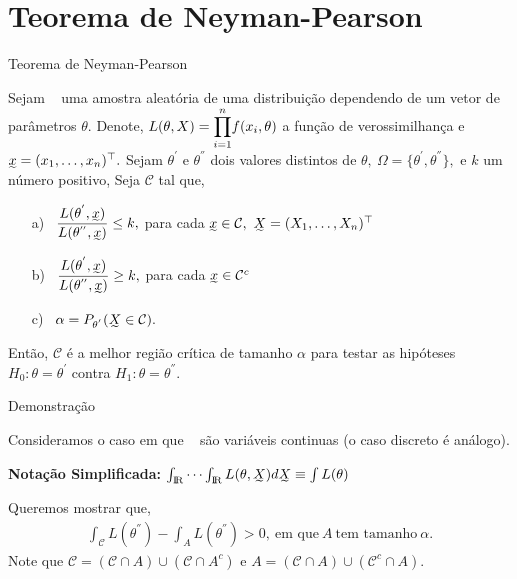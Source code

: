 \documentclass[12pt]{beamer}
\begin{document}
\section{Teorema de Neyman-Pearson}
\begin{frame}{Teorema de Neyman-Pearson}
\vspace{-0.5cm}
\begin{Teorema}
\justifying
Sejam \seqX~ uma amostra aleatória de uma distribuição dependendo de um vetor de parâmetros $\theta.$ Denote,
$L(\theta,X)={\displaystyle \prod_{i=1}^{n}} f(x_{i},\theta)$ a função de verossimilhança e $\undertilde{x}=(x_{1},\ldots,x_{n})^{\top}.$ Sejam $\theta^{'}$ e $\theta^{''}$ dois valores distintos de $\theta,~\Omega=\{\theta^{'},\theta^{''}\},$ e $k$ um número positivo, Seja $\mathcal{C}$ tal que,
\begin{enumerate}
    \item[a)~]$\dfrac{L(\theta^{'},\undertilde{x})}{L(\theta^{''},\undertilde{x})}\leq k,$ para cada $\undertilde{x}\in\mathcal{C},~\undertilde{X}=(X_{1},\ldots,X_{n})^{\top}$
    \item[b)~]$\dfrac{L(\theta^{'},\undertilde{x})}{L(\theta^{''},\undertilde{x})}\geq k,$ para cada $\undertilde{x}\in\mathcal{C}^{c}$
    \item[c)~]$\alpha=P_{\theta^{'}}(\undertilde{X}\in\mathcal{C}).$
\end{enumerate}
Então, $\mathcal{C}$ é a melhor região crítica de tamanho $\alpha$ para testar as hipóteses $H_{0}:\theta=\theta^{'}$ contra $H_{1}:\theta=\theta^{''}.$
\end{Teorema}
\end{frame}

\begin{frame}{Demonstração}
\begin{block}{}
\justifying
Consideramos o caso em que \seqX~ são variáveis continuas (o caso discreto é análogo).

\textbf{Notação Simplificada:} $\int_{\R}\cdots\int_{\R}L(\theta,\undertilde{X})d\undertilde{X}\equiv \int L(\theta)$
\end{block}
\pause
\begin{block}{}
\justifying
Queremos mostrar que,
\begin{align*}
    \int_{\mathcal{C}}L(\theta^{''})-\int_{A}L(\theta^{''})>0,~\text{em que}~A~\text{tem tamanho}~\alpha.
\end{align*}
Note que $\mathcal{C}=(\mathcal{C}\cap A)\cup (\mathcal{C}\cap A^{c})$ e $A=(\mathcal{C}\cap A)\cup (\mathcal{C}^{c}\cap A).$
\end{block}
\end{frame}
\end{document}
